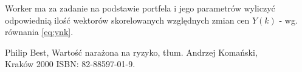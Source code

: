 \documentclass[12pt,titlepage]{article}
\numberwithin{equation}{section}
\begin{document}
Worker ma za zadanie na podstawie portfela i jego parametrów wyliczyć odpowiednią ilość wektorów skorelowanych względnych zmian cen $Y(k)$ - wg. równania \eqref{eq:ynk}.












\newpage



Philip Best, Wartość narażona na ryzyko, tłum. Andrzej Komański,
\\
Kraków 2000 ISBN: 82-88597-01-9.
\end{document}
